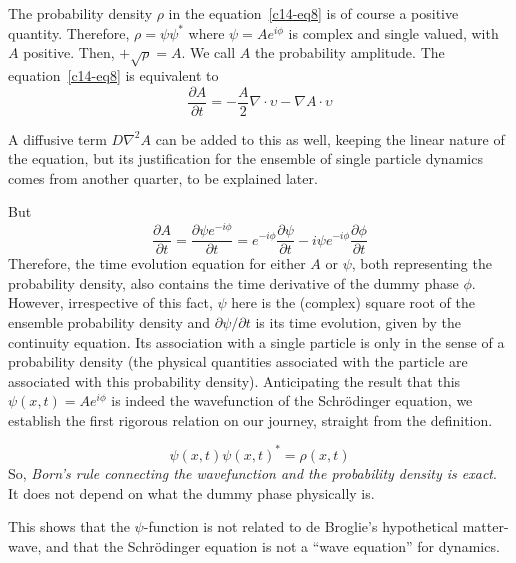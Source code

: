 The probability density $\rho$ in the equation~\ref{c14-eq8} is of course a positive quantity. Therefore,
$\rho = \psi \psi^{\ast}$ where $\psi = Ae^{i\phi}$ is complex and single valued, with $A$ positive. Then, $+\sqrt{\rho} = A$.
We call $A$ the probability amplitude. The equation~\ref{c14-eq8} is equivalent to
\begin{equation*}
\frac{\partial A}{\partial t} = -\frac{A}{2} \nabla \cdot \upsilon - \nabla A \cdot \upsilon \tag{10}\label{c14-eq10}
\end{equation*}

A diffusive term $D \nabla^2 A$ can be added to this as well, keeping the linear nature of the equation,
but its justification for the ensemble of single particle dynamics comes from another quarter,
to be explained later.

But
{\fontsize{9}{9}\selectfont\begin{equation*}
\frac{\partial A}{\partial t} = \frac{\partial \psi e^{-i \phi}}{\partial t} = e^{-i \phi} \frac{\partial \psi}{\partial t} -  i \psi e^{-i \phi} \frac{\partial \phi}{\partial t}  \tag{11}\label{c14-eq11}
\end{equation*}}
Therefore, the time evolution equation for either $A$ or $\psi$, both representing the probability
density, also contains the time derivative of the dummy phase $\phi$. However, irrespective
of this fact, $\psi$ here is the (complex) square root of the ensemble probability density and
$\partial \psi /\partial t$ is its time evolution, given by the continuity equation. Its association with a single
particle is only in the sense of a probability density (the physical quantities associated with
the particle are associated with this probability density). Anticipating the result that this
$\psi (x, t) = Ae^{i \phi}$ is indeed the wavefunction of the Schr\"{o}dinger equation, we establish the first
rigorous relation on our journey, straight from the definition.

{\fontsize{9}{9}\selectfont\begin{equation*}
\psi (x, t) \psi (x, t)^{\ast} = \rho(x, t) \tag{12}\label{c14-eq12}
\end{equation*}}
So, \textit{Born's rule connecting the wavefunction and the probability density is exact}. It does
not depend on what the dummy phase physically is.

This shows that the $\psi$-function is not related to de Broglie’s hypothetical matter-wave, and that the Schr\"{o}dinger equation is not
a ``wave equation'' for dynamics.

